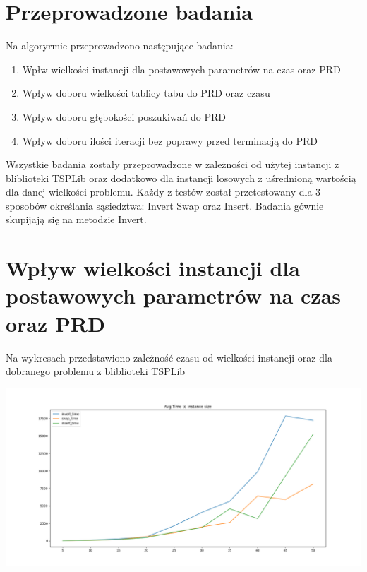 \documentclass{article}
\begin{document}
\section{Przeprowadzone badania}
Na algoryrmie przeprowadzono następujące badania:
\begin{enumerate}
  \item Wpłw wielkości instancji dla postawowych parametrów na czas oraz PRD
  \item Wpływ doboru wielkości tablicy tabu do PRD oraz czasu
  \item Wpływ doboru głębokości poszukiwań do PRD
  \item Wpływ doboru ilości iteracji bez poprawy przed terminacją do PRD
\end{enumerate}

Wszystkie badania zostały przeprowadzone w zależności od użytej instancji z bliblioteki
TSPLib oraz dodatkowo dla instancji losowych z uśrednioną wartością dla danej wielkości problemu.
Każdy z testów został przetestowany dla 3 sposobów określania sąsiedztwa: Invert Swap oraz Insert.
Badania gównie skupijają się na metodzie Invert.

\section{Wpływ wielkości instancji dla postawowych parametrów na czas oraz PRD}

Na wykresach przedstawiono zależność czasu od wielkości instancji oraz dla dobranego problemu
z bliblioteki TSPLib
\begin{adjustwidth}{-5cm}{-5cm}
  \begin{center}
    \includegraphics[scale=0.45]{rand_time.png}
  \end{center}
\end{adjustwidth}
\end{document}
